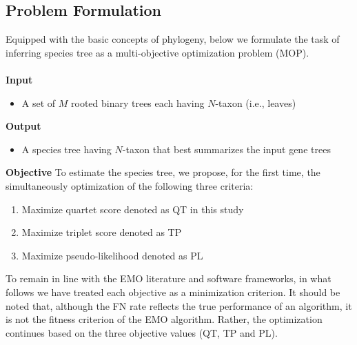 \subsection{Problem Formulation}
\label{sec:problem}
Equipped with the basic concepts of phylogeny, below we formulate the task of inferring species tree as a multi-objective optimization problem (MOP).\\\\
\textbf{Input}
\begin{itemize}
	\item A set of $M$ rooted binary trees each having $N$-taxon (i.e., leaves)
\end{itemize}
\textbf{Output}
\begin{itemize}
	\item A species tree having $N$-taxon that best summarizes the input gene trees
\end{itemize}
\textbf{Objective} To estimate the species tree, we propose, for the first time, the simultaneously optimization of the following three criteria:
\begin{enumerate}[label=$F_\arabic*$)]
	\item  Maximize quartet score denoted as QT in this study
	\item  Maximize triplet score denoted as TP 
	\item  Maximize pseudo-likelihood denoted as PL    
\end{enumerate}

To remain in line with the EMO literature and software frameworks, in what follows we have treated each objective as a minimization criterion. It should be noted that, although the FN rate reflects the true performance of an algorithm, it is not the fitness criterion of the EMO algorithm. Rather, the optimization continues based on the three objective values (QT, TP and PL).

